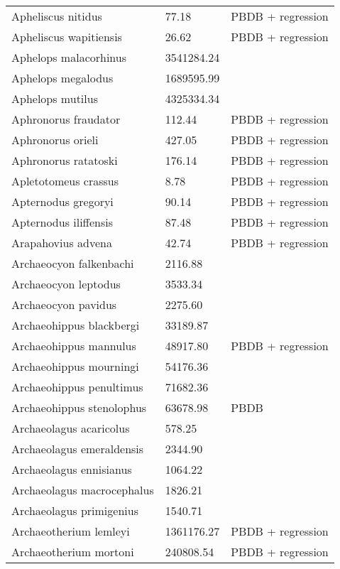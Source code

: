 \documentclass{article}
\begin{document}
\begin{center}
\begin{longtable}{p{} p{} p{}}
    Apheliscus nitidus & 77.18 & PBDB + regression \\ 
    Apheliscus wapitiensis & 26.62 & PBDB + regression \\ 
    Aphelops malacorhinus & 3541284.24 & \cite{Tomiya2013} \\ 
    Aphelops megalodus & 1689595.99 & \cite{Tomiya2013} \\ 
    Aphelops mutilus & 4325334.34 & \cite{Tomiya2013} \\ 
    Aphronorus fraudator & 112.44 & PBDB + regression \\ 
    Aphronorus orieli & 427.05 & PBDB + regression \\ 
    Aphronorus ratatoski & 176.14 & PBDB + regression \\ 
    Apletotomeus crassus & 8.78 & PBDB + regression \\ 
    Apternodus gregoryi & 90.14 & PBDB + regression \\ 
    Apternodus iliffensis & 87.48 & PBDB + regression \\ 
    Arapahovius advena & 42.74 & PBDB + regression \\ 
    Archaeocyon falkenbachi & 2116.88 & \cite{Stirton1932} \\ 
    Archaeocyon leptodus & 3533.34 & \cite{Tomiya2013} \\ 
    Archaeocyon pavidus & 2275.60 & \cite{Tomiya2013} \\ 
    Archaeohippus blackbergi & 33189.87 & \cite{Tomiya2013} \\ 
    Archaeohippus mannulus & 48917.80 & PBDB + regression \\ 
    Archaeohippus mourningi & 54176.36 & \cite{Tomiya2013} \\ 
    Archaeohippus penultimus & 71682.36 & \cite{Tomiya2013} \\ 
    Archaeohippus stenolophus & 63678.98 & PBDB \\ 
    Archaeolagus acaricolus & 578.25 & \cite{Tomiya2013} \\ 
    Archaeolagus emeraldensis & 2344.90 & \cite{Tomiya2013} \\ 
    Archaeolagus ennisianus & 1064.22 & \cite{Tomiya2013} \\ 
    Archaeolagus macrocephalus & 1826.21 & \cite{Tomiya2013} \\ 
    Archaeolagus primigenius & 1540.71 & \cite{Tomiya2013} \\ 
    Archaeotherium lemleyi & 1361176.27 & PBDB + regression \\ 
    Archaeotherium mortoni & 240808.54 & PBDB + regression \\ 

\end{longtable}
\end{center}
\end{document}
